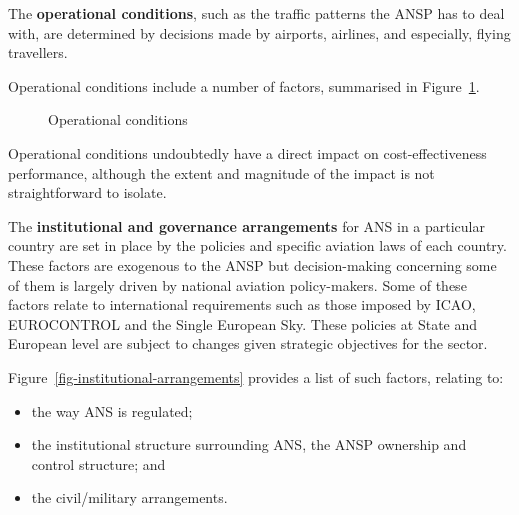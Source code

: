 \documentclass[
  11pt,
  a4paperpaper,
  openany,headsepline=on,footsepline=off,DIV=12,table]{scrbook}
\providecommand{\tightlist}{%
  \setlength{\itemsep}{0pt}\setlength{\parskip}{0pt}}\usepackage{longtable,booktabs,array}
\begin{document}
The \textbf{operational conditions}, such as the traffic patterns the
ANSP has to deal with, are determined by decisions made by airports,
airlines, and especially, flying travellers.

Operational conditions include a number of factors, summarised in
Figure~\ref{fig-operational-conditions}.

\begin{figure}[H]


\caption{\label{fig-operational-conditions}Operational conditions}

\end{figure}%

Operational conditions undoubtedly have a direct impact on
cost-effectiveness performance, although the extent and magnitude of the
impact is not straightforward to isolate.

The \textbf{institutional and governance arrangements} for ANS in a
particular country are set in place by the policies and specific
aviation laws of each country. These factors are exogenous to the ANSP
but decision-making concerning some of them is largely driven by
national aviation policy-makers. Some of these factors relate to
international requirements such as those imposed by ICAO, EUROCONTROL
and the Single European Sky. These policies at State and European level
are subject to changes given strategic objectives for the sector.

Figure~\ref{fig-institutional-arrangements} provides a list of such
factors, relating to:

\begin{itemize}
\tightlist
\item
  the way ANS is regulated;
\item
  the institutional structure surrounding ANS, the ANSP ownership and
  control structure; and
\item
  the civil/military arrangements.
\end{itemize}
\end{document}
